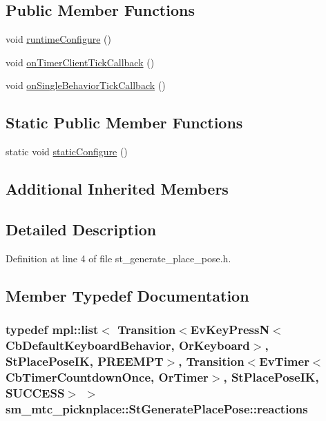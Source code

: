 \subsection*{Public Member Functions}
\begin{DoxyCompactItemize}
\item 
void \hyperlink{structsm__mtc__picknplace_1_1StGeneratePlacePose_a2ee3f00686bb27813da950c93b680f6c}{runtime\+Configure} ()
\item 
void \hyperlink{structsm__mtc__picknplace_1_1StGeneratePlacePose_aab518eeb39277d6dd1cf07397a4580ec}{on\+Timer\+Client\+Tick\+Callback} ()
\item 
void \hyperlink{structsm__mtc__picknplace_1_1StGeneratePlacePose_a1b95ce5c3778f50c408a7407ad05f4b4}{on\+Single\+Behavior\+Tick\+Callback} ()
\end{DoxyCompactItemize}
\subsection*{Static Public Member Functions}
\begin{DoxyCompactItemize}
\item 
static void \hyperlink{structsm__mtc__picknplace_1_1StGeneratePlacePose_aec0531217742f84bae9369f7f7d443a9}{static\+Configure} ()
\end{DoxyCompactItemize}
\subsection*{Additional Inherited Members}


\subsection{Detailed Description}


Definition at line 4 of file st\+\_\+generate\+\_\+place\+\_\+pose.\+h.



\subsection{Member Typedef Documentation}
\subsubsection[{\texorpdfstring{reactions}{reactions}}]{\setlength{\rightskip}{0pt plus 5cm}typedef mpl\+::list$<$ Transition$<$Ev\+Key\+PressN$<$Cb\+Default\+Keyboard\+Behavior, {\bf Or\+Keyboard}$>$, {\bf St\+Place\+Pose\+IK}, {\bf P\+R\+E\+E\+M\+PT}$>$, Transition$<$Ev\+Timer$<$Cb\+Timer\+Countdown\+Once, {\bf Or\+Timer}$>$, {\bf St\+Place\+Pose\+IK}, {\bf S\+U\+C\+C\+E\+SS}$>$ $>$ {\bf sm\+\_\+mtc\+\_\+picknplace\+::\+St\+Generate\+Place\+Pose\+::reactions}}\hypertarget{structsm__mtc__picknplace_1_1StGeneratePlacePose_a549e3d54ce7c0104116c301ae25a23f2}{}\label{structsm__mtc__picknplace_1_1StGeneratePlacePose_a549e3d54ce7c0104116c301ae25a23f2}


